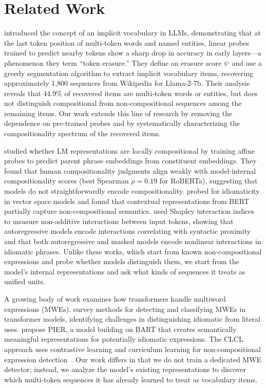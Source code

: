 \section{Related Work}
\label{sec:related}

\citet{feucht2024token} introduced the concept of an implicit vocabulary in LLMs, demonstrating that at the last token position of multi-token words and named entities, linear probes trained to predict nearby tokens show a sharp drop in accuracy in early layers---a phenomenon they term ``token erasure.''
They define an erasure score $\psi$ and use a greedy segmentation algorithm to extract implicit vocabulary items, recovering approximately 1{,}800 sequences from Wikipedia for Llama-2-7b.
Their analysis reveals that 44.9\% of recovered items are multi-token words or entities, but does not distinguish compositional from non-compositional sequences among the remaining items.
Our work extends this line of research by removing the dependence on pre-trained probes and by systematically characterizing the compositionality spectrum of the recovered items.

\citet{liu2022representations} studied whether LM representations are locally compositional by training affine probes to predict parent phrase embeddings from constituent embeddings.
They found that human compositionality judgments align weakly with model-internal compositionality scores (best Spearman $\rho = 0.19$ for RoBERTa), suggesting that models do not straightforwardly encode compositionality.
\citet{garcia2021probing} probed for idiomaticity in vector space models and found that contextual representations from BERT partially capture non-compositional semantics.
\citet{singhvi2024shapley} used Shapley interaction indices to measure non-additive interactions between input tokens, showing that autoregressive models encode interactions correlating with syntactic proximity and that both autoregressive and masked models encode nonlinear interactions in idiomatic phrases.
Unlike these works, which start from known non-compositional expressions and probe whether models distinguish them, we start from the model's internal representations and ask what kinds of sequences it treats as unified units.

A growing body of work examines how transformers handle multiword expressions (MWEs).
\citet{nedumpozhimana2022survey} survey methods for detecting and classifying MWEs in transformer models, identifying challenges in distinguishing idiomatic from literal uses.
\citet{zhou2023pier} propose PIER, a model building on BART that creates semantically meaningful representations for potentially idiomatic expressions.
The CLCL approach uses contrastive learning and curriculum learning for non-compositional expression detection~\cite{clcl2023}.
Our work differs in that we do not train a dedicated MWE detector; instead, we analyze the model's existing representations to discover which multi-token sequences it has already learned to treat as vocabulary items.

